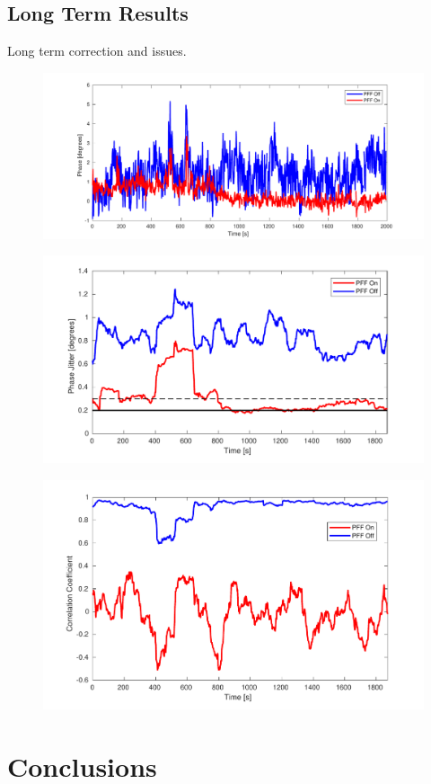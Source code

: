 \documentclass[%
 reprint,
 superscriptaddress,
 amsmath,
 amssymb,
 prstab,
]{revtex4-1}
\begin{document}
\subsection{\label{ss:longResults}Long Term Results}

Long term correction and issues.

\begin{figure}
	\includegraphics[width=\columnwidth]{figs/res/longMeanMon3}%
	\caption{\label{f:longMeanMon3}
	}
\end{figure}
\begin{figure}
	\includegraphics[width=\columnwidth]{figs/res/JitNext50}%
	\caption{\label{f:JitNext50}
	}
\end{figure}
\begin{figure}
	\includegraphics[width=\columnwidth]{figs/res/CorrNext50}%
	\caption{\label{f:CorrNext50}
	}
\end{figure}

\section{\label{s:conc}Conclusions}

\begin{acknowledgments}

\end{acknowledgments}


\end{document}
